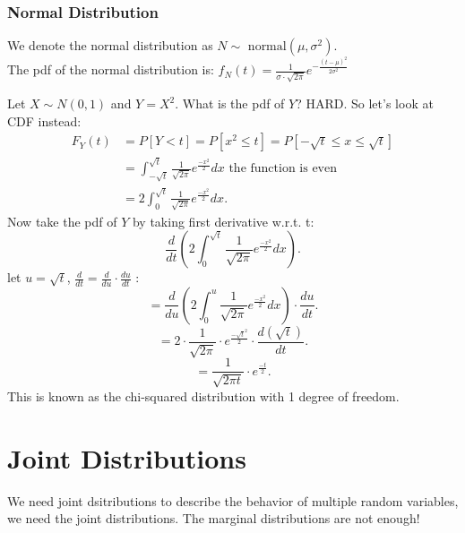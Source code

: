 \documentclass[a4paper]{article}
\begin{document}
\subsubsection{Normal Distribution}
We denote the normal distribution as $N \sim \text{ normal}(\mu, \sigma^2)$. \\ 
The pdf of the normal distribution is: $f_N(t) = \frac{1}{\sigma \cdot \sqrt{2 \pi} }e^{-\frac{(t - \mu)^2}{2\sigma^2}}$

\begin{note}
  Let $X \sim N(0,1)$ and $Y = X^2$. What is the pdf of $Y$? HARD. So let's look at CDF instead:
  \begin{align*}
    F_Y(t) &= P[Y < t] = P[x^2 \leq t ] = P[- \sqrt{t} \leq x \leq \sqrt{t}] \\ 
           &= \int_{-\sqrt{t}}^{\sqrt{t}} \frac{1}{\sqrt{2\pi}} e^\frac{-x^2}{2} dx   \text{ the function is even} \\
           &= 2 \int_{0}^{\sqrt{t}} \frac{1}{\sqrt{2\pi}} e^\frac{-x^2}{2} dx 
  .\end{align*}
  Now take the pdf of $Y$ by taking first derivative w.r.t. t:
  \[
    \frac{d}{dt}\left(2 \int_0^{\sqrt{t}}  \frac{1}{\sqrt{2\pi}} e^\frac{-x^2}{2} dx  \right) 
  .\] 
  let $u = \sqrt{t}$, $\frac{d}{dt} = \frac{d}{du} \cdot \frac{du}{dt}$ :
  \[
    =\frac{d}{du}\left(2 \int_0^{u}  \frac{1}{\sqrt{2\pi}} e^\frac{-x^2}{2} dx  \right) \cdot \frac{du}{dt}
  .\] 
  \[
    = 2 \cdot \frac{1}{\sqrt{2 \pi}} \cdot e^{\frac{-\sqrt{t}^2}{2}} \cdot \frac{d(\sqrt{t})}{dt} 
  .\] 
  \[
  = \frac{1}{\sqrt{2 \pi t}} \cdot e^\frac{-t}{2}
  .\]
  This is known as the chi-squared distribution with 1 degree of freedom.
\end{note}

\section{Joint Distributions}
We need joint dsitributions to describe the behavior of multiple random variables, we need the joint distributions.
The marginal distributions are not enough! 
\end{document}
